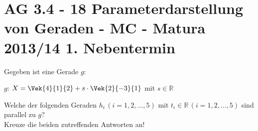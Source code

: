 \section{AG 3.4 - 18 Parameterdarstellung von Geraden - MC - Matura 2013/14 1. Nebentermin}

\begin{beispiel}[AG 3.4]{1} %
				Gegeben ist eine Gerade $g$:
				
				$g$: $X=\Vek{4}{1}{2}+s\cdot\Vek{2}{-3}{1}$ mit $s\in\mathbb{R}$
				
				Welche der folgenden Geraden $h_i\,(i=1,2,...,5)$ mit $t_i\in\mathbb{R}\,(i=1,2,...,5)$ sind parallel zu $g$?\\
				Kreuze die beiden zutreffenden Antworten an!\leer
				
\end{beispiel}